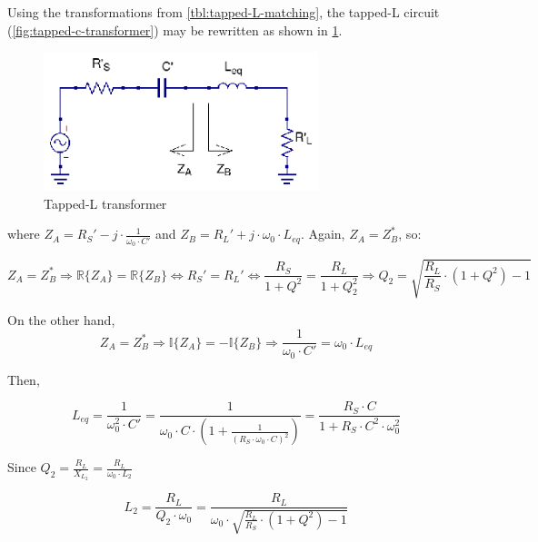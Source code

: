 \noindent Using the transformations from \ref{tbl:tapped-L-matching}, the tapped-L circuit (\ref{fig:tapped-c-transformer}) may be rewritten as shown in \ref{fig:tapped-c-transformer-equivalent}.

\begin{figure}[H]
\centering
\includegraphics[width=80mm]{./images/Synthesis/Impedance_Matching/Tapped-L-equivalent}
\caption{Tapped-L transformer}
\label{fig:tapped-c-transformer-equivalent}
\end{figure}

\noindent where $Z_A = R_S' - j \cdot \frac{1}{\omega_0 \cdot C'}$ and $Z_B = R_L' + j \cdot \omega_0 \cdot L_{eq}$. Again, $Z_A = Z_B^*$, so:

\begin{equation}
Z_A = Z_B^* \Longrightarrow \mathbb{R} \lbrace Z_A \rbrace  = \mathbb{R} \lbrace Z_B \rbrace \Longleftrightarrow R_S' = R_L' \Longleftrightarrow \frac{R_S}{1 + Q^2} = \frac{R_L}{1 + Q_2^2} \Longrightarrow Q_2 = \sqrt{\frac{R_L}{R_S} \cdot (1 + Q^2) - 1}
\end{equation}

\noindent On the other hand,
\begin{equation}
Z_A = Z_B^* \Longrightarrow \mathbb{I} \lbrace Z_A \rbrace  = -\mathbb{I} \lbrace Z_B \rbrace \Longrightarrow \frac{1}{\omega_0 \cdot C'} = \omega_0 \cdot L_{eq}
\end{equation}

\noindent Then,

\begin{equation}
L_{eq} = \frac{1}{\omega_0^2 \cdot C'} = \frac{1}{\omega_0 \cdot C \cdot \left( 1 + \frac{1}{(R_S \cdot \omega_0 \cdot C)^2}\right)} = \frac{R_S \cdot C}{1 + R_S \cdot C^2 \cdot \omega_0^2}
\end{equation}

\noindent Since $Q_2 = \frac{R_L}{X_{L_2}} = \frac{R_L}{\omega_0 \cdot L_2}$

\begin{equation}
L_2 = \frac{R_L}{Q_2 \cdot \omega_0} = \frac{R_L}{\omega_0 \cdot \sqrt{\frac{R_L}{R_S} \cdot (1 + Q^2) - 1}}
\end{equation}

